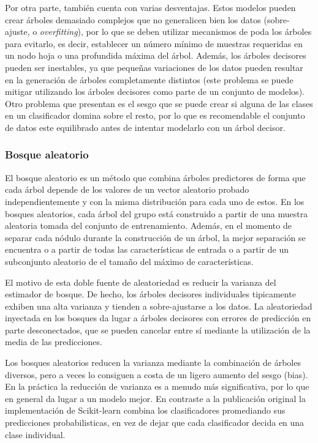 Por otra parte, también cuenta con varias desventajas.
Estos modelos pueden crear árboles demasiado complejos que no generalicen bien los datos (sobre-ajuste, o \emph{overfitting}), por lo que se deben utilizar mecanismos de poda los árboles para evitarlo, es decir, establecer un número mínimo de muestras requeridas en un nodo hoja o una profundida máxima del árbol.
Además, los árboles decisores pueden ser inestables, ya que pequeñas variaciones de los datos pueden resultar en la generación de árboles completamente distintos (este problema se puede mitigar utilizando los árboles decisores como parte de un conjunto de modelos).
Otro problema que presentan es el sesgo que se puede crear si alguna de las clases en un clasificador domina sobre el resto, por lo que es recomendable el conjunto de datos este equilibrado antes de intentar modelarlo con un árbol decisor.

\subsubsection{Bosque aleatorio}


El bosque aleatorio es un método que combina árboles predictores de forma que cada árbol depende de los valores de un vector aleatorio probado independientemente y con la misma distribución para cada uno de estos.
En los bosques aleatorios, cada árbol del grupo está construido a partir de una muestra aleatoria tomada del conjunto de entrenamiento.
Además, en el momento de separar cada nódulo durante la construcción de un árbol, la mejor separación se encuentra o a partir de todas las características de entrada o a partir de un subconjunto aleatorio de el tamaño del máximo de características.

El motivo de esta doble fuente de aleatoriedad es reducir la varianza del estimador de bosque.
De hecho, los árboles decisores individuales tipicamente exhiben una alta varianza y tienden a sobre-ajustarse a los datos.
La aleatoriedad inyectada en los bosques da lugar a árboles decisores con errores de predicción en parte desconectados, 
que se pueden cancelar entre sí mediante la utilización de la media de las predicciones.

Los bosques aleatorios reducen la varianza mediante la combinación de árboles diversos, pero a veces lo consiguen a costa de un ligero aumento del sesgo (bias).
En la práctica la reducción de varianza es a menudo más significativa, por lo que en general da lugar a un modelo mejor.
En contraste a la publicación original %
la implementación de Scikit-learn combina los clasificadores promediando sus predicciones probabilisticas, en vez de dejar que cada clasificador decida en una clase individual.

